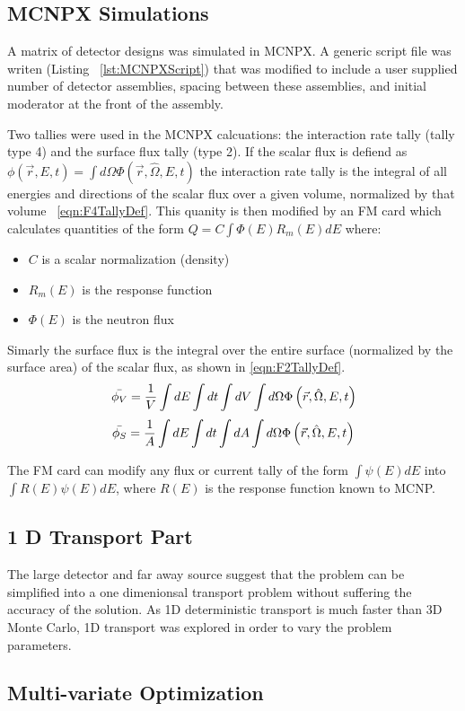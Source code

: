 \subsection{MCNPX Simulations}
\label{sec:MCNPXMethods}
A matrix of detector designs was simulated in MCNPX.
A generic script file was writen (Listing ~\ref{lst:MCNPXScript}) that was modified to include a user supplied number of detector assemblies, spacing between these assemblies, and initial moderator at the front of the assembly.


Two tallies were used in the MCNPX calcuations: the interaction rate tally (tally type 4) and the surface flux tally (type 2).
If the scalar flux is defiend as $\phi(\vec{r},E,t)=\int d\Omega \Phi(\vec{r},\hat{\Omega},E,t)$ the  interaction rate tally is the integral of all energies and directions of the scalar flux over a given volume, normalized by that volume ~\eqref{eqn:F4TallyDef}.
This quanity is then modified by an FM card which calculates quantities of the form $Q = C \int {\Phi(E) R_m(E) dE }$ where:
\begin{itemize}
    \item $C$ is a scalar normalization (density)
    \item $R_m(E)$ is the response function
    \item $\Phi(E)$ is the neutron flux
\end{itemize}
Simarly the surface flux is the integral over the entire surface (normalized by the surface area) of the scalar flux, as shown in \eqref{eqn:F2TallyDef}.
\begin{align}
    \label{eqn:F4TallyDef}
    \bar{\phi_V} = \frac{1}{V}\int dE \int dt \int dV \int d\Omega \Phi \left ( \vec{r},\hat{\Omega},E,t \right )
\end{align}
\begin{align}
    \label{eqn:F2TallyDef}
    \bar{\phi_S} = \frac{1}{A}\int dE \int dt \int dA \int d\Omega \Phi \left ( \vec{r},\hat{\Omega},E,t \right )
\end{align}

The FM card can modify any flux or current tally of the form $\int \psi (E) dE$ into $\int R(E)\psi(E) dE$, where $R(E)$ is the response function known to MCNP.
\subsection{1 D Transport Part}
The large detector and far away source suggest that the problem can be simplified into a one dimenionsal transport problem without suffering the accuracy of the solution.
As 1D deterministic transport is much faster than 3D Monte Carlo, 1D transport was explored in order to vary the problem parameters.

\subsection{Multi-variate Optimization}
\label{sec:MVOptimization}

